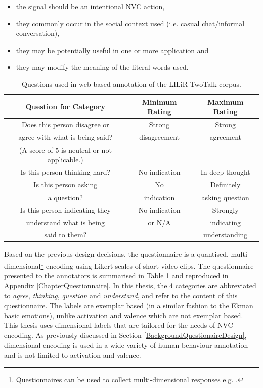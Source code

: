 \begin{itemize}
 \item the signal should be an intentional \ac{NVC} action,
 \item they commonly occur in the social context used (i.e. casual chat/informal conversation),
 \item they may be potentially useful in one or more application and
 \item they may modify the meaning of the literal words used.
\end{itemize}

\begin{table}
\centering
\caption{Questions used in web based annotation of the LILiR TwoTalk corpus.}
\begin{tabular}{ | c | c | c | }
\hline
Question for Category & Minimum Rating & Maximum Rating \\
\hline
\hline
Does this person disagree or & Strong  & Strong  \\
agree with what is being said? & disagreement & agreement\\
(A score of 5 is neutral or not applicable.) & & \\
\hline
Is this person thinking hard? & No indication & In deep thought \\
\hline
Is this person asking & No & Definitely \\
a question? & indication & asking question\\
\hline
Is this person indicating they & No indication & Strongly  \\
understand what is being & or N/A & indicating\\
said to them? & & understanding\\
\hline
\end{tabular}
\label{CategoryLabels}
\end{table}

Based on the previous design decisions, the questionnaire is a quantised, multi-dimensional\footnote{Questionnaires can be used to collect multi-dimensional responses e.g. \cite{Tellegen2008}.} encoding using Likert scales of short video clips. The questionnaire presented to the annotators is summarised in Table \ref{CategoryLabels} and reproduced in Appendix \ref{ChapterQuestionnaire}. In this thesis, the 4 categories are abbreviated to \textit{agree}, \textit{thinking}, \textit{question} and \textit{understand}, and refer to the content of this questionnaire. The labels are exemplar based (in a similar fashion to the Ekman basic emotions), unlike activation and valence which are not exemplar based. This thesis uses dimensional labels that are tailored for the needs of \ac{NVC} encoding. As previously discussed in Section \ref{BackgroundQuestionaireDesign}, dimensional encoding is used in a wide variety of human behaviour annotation and is not limited to activation and valence.

